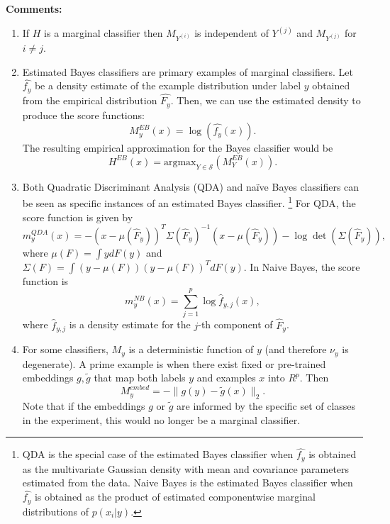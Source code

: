 \documentclass[twoside,11pt]{article}
\begin{document}
\textbf{Comments:}
\begin{enumerate}
\item If $H$ is a marginal classifier then 
$M_{Y^{(i)}}$ is independent of $Y^{(j)}$ and $M_{Y^{(j)}}$ for $i \neq j$.
\item Estimated Bayes classifiers are primary examples of marginal
  classifiers. Let $\hat{f_y}$ be a density estimate of the example
  distribution under label $y$ obtained from the empirical
  distribution $\hat{F_y}$. Then, we can use the estimated density to
  produce the score functions:
\[ M^{EB}_y(x) = \log(\hat{f_{y}}(x)).\]
The resulting empirical approximation for the Bayes classifier would
be
\[ H^{EB}(x) = \text{argmax}_{Y \in \mathcal{S}}(M^{EB}_Y(x)).\]

\item Both Quadratic Discriminant Analysis (QDA) and na\"{i}ve Bayes
  classifiers can be seen as specific instances of an estimated Bayes
  classifier.
\footnote{QDA is the special case of the estimated Bayes classifier
  when $\hat{f_y}$ is obtained as the multivariate Gaussian density
  with mean and covariance parameters estimated from the data.  Naive
  Bayes is the estimated Bayes classifier when $\hat{f_y}$ is obtained
  as the product of estimated componentwise marginal distributions of
  $p(x_i|y)$.}  For QDA, the score function is given by
\[
m_y^{QDA}(x) = -(x - \mu(\hat{F}_y))^T \Sigma(\hat{F}_y)^{-1} (x-\mu(\hat{F}_y)) - \log\det(\Sigma(\hat{F}_y)),
\]
where $\mu(F) = \int y dF(y)$ and $\Sigma(F) = \int (y-\mu(F))(y-\mu(F))^T dF(y)$.
In Naive Bayes, the score function is
\[
m^{NB}_y(x) = \sum_{j=1}^p \log \hat{f}_{y, j}(x),
\]
where $\hat{f}_{y, j}$ is a density estimate for the $j$-th component of
$\hat{F}_y$.
\item For some classifiers, $M_y$ is a deterministic function of $y$
  (and therefore $\nu_y$ is degenerate). A prime example is when
  there exist fixed or pre-trained embeddings $g, \tilde{g}$ that map both
  labels $y$ and examples $x$ into $R^p$. Then
\begin{equation}
M_y^{embed} = -\|g(y) - \tilde{g}(x)\|_2.
\end{equation}
Note that if the embeddings $g$ or $\tilde{g}$ are informed by the specific set of classes in the experiment, this would no longer be a marginal classifier. %

\end{enumerate}
\end{document}
